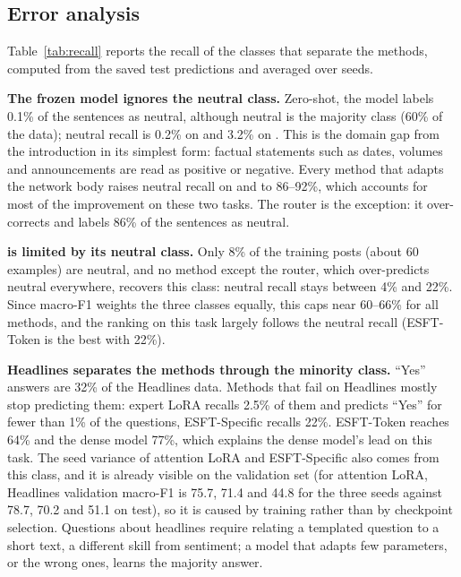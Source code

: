 \subsection{Error analysis}
\label{sec:errors}
Table~\ref{tab:recall} reports the recall of the classes that separate the methods, computed
from the saved test predictions and averaged over seeds.

\textbf{The frozen model ignores the neutral class.} Zero-shot, the model labels 0.1\% of the
\fpb{} sentences as neutral, although neutral is the majority class (60\% of the data); neutral
recall is 0.2\% on \fpb{} and 3.2\% on \tfns{}. This is the domain gap from the introduction in
its simplest form: factual statements such as dates, volumes and announcements are read as
positive or negative. Every method that adapts the network body raises neutral recall on
\fpb{} and \tfns{} to 86--92\%, which accounts for most of the improvement on these two tasks.
The router is the exception: it over-corrects and labels 86\% of the \fpb{} sentences as neutral.

\textbf{\fiqa{} is limited by its neutral class.} Only 8\% of the \fiqa{} training posts (about
60 examples) are neutral, and no method except the router, which over-predicts neutral
everywhere, recovers this class: neutral recall stays between 4\% and 22\%. Since macro-F1
weights the three classes equally, this caps \fiqa{} near 60--66\% for all methods, and the
ranking on this task largely follows the neutral recall (ESFT-Token is the best with 22\%).

\textbf{Headlines separates the methods through the minority class.} ``Yes'' answers are 32\%
of the Headlines data. Methods that fail on Headlines mostly stop predicting them: expert LoRA
recalls 2.5\% of them and predicts ``Yes'' for fewer than 1\% of the questions, ESFT-Specific
recalls 22\%. ESFT-Token reaches 64\% and the dense model 77\%, which explains the dense
model's lead on this task. The seed variance of attention LoRA and ESFT-Specific also comes from
this class, and it is already visible on the validation set (for attention LoRA, Headlines
validation macro-F1 is 75.7, 71.4 and 44.8 for the three seeds against 78.7, 70.2 and 51.1 on
test), so it is caused by training rather than by checkpoint selection. Questions about
headlines require relating a templated question to a short text, a different skill from
sentiment; a model that adapts few parameters, or the wrong ones, learns the majority answer.

